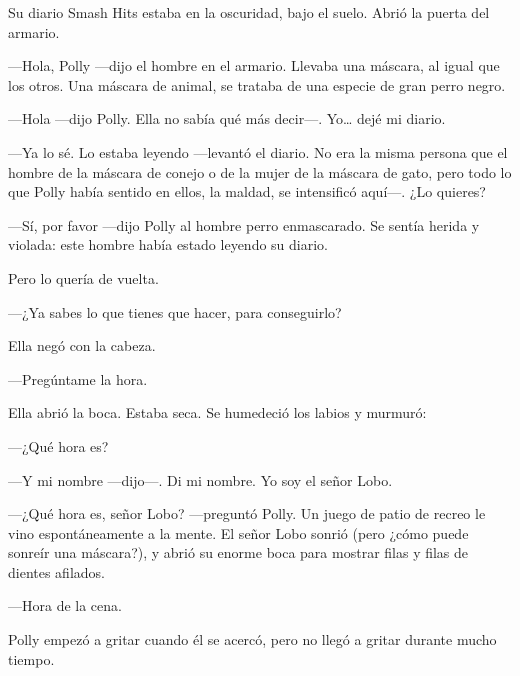 Su diario Smash Hits estaba en la oscuridad, bajo el suelo. Abrió la puerta del armario.

---Hola, Polly ---dijo el hombre en el armario. Llevaba una máscara, al igual que los otros. Una máscara de animal, se trataba de una especie de gran perro negro.

---Hola ---dijo Polly. Ella no sabía qué más decir---. Yo\ldots{} dejé mi diario.

---Ya lo sé. Lo estaba leyendo ---levantó el diario. No era la misma persona que el hombre de la máscara de conejo o de la mujer de la máscara de gato, pero todo lo que Polly había sentido en ellos, la maldad, se intensificó aquí---. ¿Lo quieres?

---Sí, por favor ---dijo Polly al hombre perro enmascarado. Se sentía herida y violada: este hombre había estado leyendo su diario.

Pero lo quería de vuelta.

---¿Ya sabes lo que tienes que hacer, para conseguirlo?

Ella negó con la cabeza.

---Pregúntame la hora.

Ella abrió la boca. Estaba seca. Se humedeció los labios y murmuró:

---¿Qué hora es?

---Y mi nombre ---dijo---. Di mi nombre. Yo soy el señor Lobo.

---¿Qué hora es, señor Lobo? ---preguntó Polly. Un juego de patio de recreo le vino espontáneamente a la mente. El señor Lobo sonrió (pero ¿cómo puede sonreír una máscara?), y abrió su enorme boca para mostrar filas y filas de dientes afilados.

---Hora de la cena.

Polly empezó a gritar cuando él se acercó, pero no llegó a gritar durante mucho tiempo.

